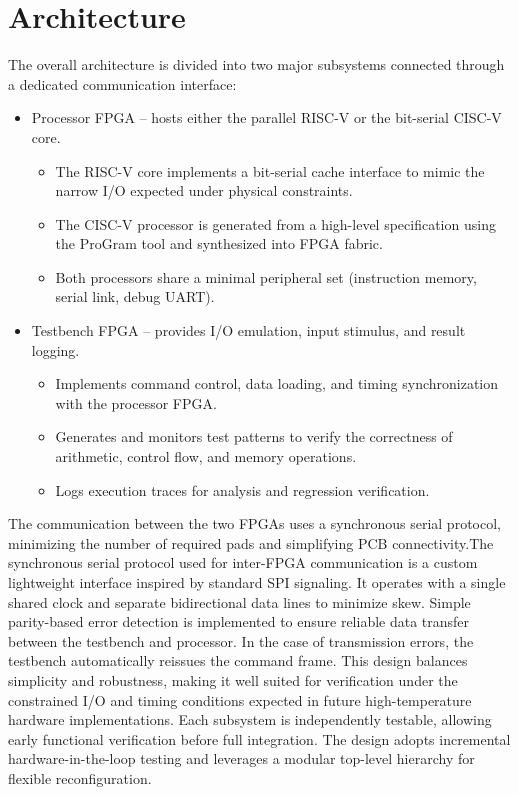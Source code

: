 \documentclass[10pt,twocolumn]{article}
\begin{document}
\section{Architecture}
The overall architecture is divided into two major subsystems connected through a dedicated communication interface:
\begin{itemize}
\item Processor FPGA – hosts either the parallel RISC-V or the bit-serial CISC-V core.
\begin{itemize}
    \item The RISC-V core implements a bit-serial cache interface to mimic the narrow I/O expected under physical constraints.
    \item The CISC-V processor is generated from a high-level specification using the ProGram tool and synthesized into FPGA fabric.
    \item Both processors share a minimal peripheral set (instruction memory, serial link, debug UART).
\end{itemize}
\item Testbench FPGA – provides I/O emulation, input stimulus, and result logging.
\begin{itemize}
    \item Implements command control, data loading, and timing synchronization with the processor FPGA.
    \item Generates and monitors test patterns to verify the correctness of arithmetic, control flow, and memory operations.
    \item Logs execution traces for analysis and regression verification.
\end{itemize}
\end{itemize}
The communication between the two FPGAs uses a synchronous serial protocol, minimizing the number of required pads and simplifying PCB connectivity.The synchronous serial protocol used for inter-FPGA communication is a custom lightweight interface inspired by standard SPI signaling. It operates with a single shared clock and separate bidirectional data lines to minimize skew. Simple parity-based error detection is implemented to ensure reliable data transfer between the testbench and processor. In the case of transmission errors, the testbench automatically reissues the command frame. This design balances simplicity and robustness, making it well suited for verification under the constrained I/O and timing conditions expected in future high-temperature hardware implementations. Each subsystem is independently testable, allowing early functional verification before full integration. The design adopts incremental hardware-in-the-loop testing and leverages a modular top-level hierarchy for flexible reconfiguration.
\end{document}
